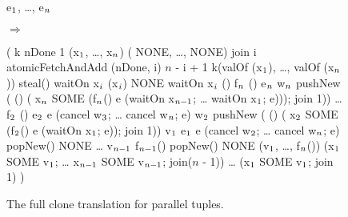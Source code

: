 \documentclass[11pt]{article}
\begin{document}
\begin{figure}
\begin{center}
\begin{code}\cdmath{}
\LDB{} \kw{(|} e\(\sb{1}\), \ldots{}, e\(\sb{n}\) \kw{|)} \RDB{}
\end{code}%
$\Longrightarrow$ \\
\begin{code}\cdmath{}
( k \kw{=>}
    nDone \kw{=}  1
       (x\(\sb{1}\), \ldots{}, x\(\sb{n}\)) \kw{=} ( NONE, \ldots{},  NONE)
       join i \kw{=} 
           atomicFetchAndAdd (nDone, i) \kw{=} $n$ - i + 1 
            k(valOf (\kw{!}x\(\sb{1}\)), \ldots{}, valOf (\kw{!}x\(\sb{n}\)))
           steal()
       waitOn x\(\sb{i}\) \kw{=}  (\kw{!}x\(\sb{i}\)) \kw{=} NONE  waitOn x\(\sb{i}\)  ()
       f\(\sb{n}\) () \kw{=} \LDB{} e\(\sb{n}\) \RDB{}                        
       w\(\sb{n}\) \kw{=} pushNew ( () \kw{=>} (
                 x\(\sb{n}\) \kw{:=} SOME (f\(\sb{n}\)() 
                     e \kw{=>} (waitOn x\(\sb{n-1}\); \ldots{} waitOn x\(\sb{1}\); 
                                  e))); 
                 join 1))
           \ldots{} 
       f\(\sb{2}\) () \kw{=} \LDB{} e\(\sb{2}\) \RDB{}  e \kw{=>} (cancel w\(\sb{3}\); \ldots{} cancel w\(\sb{n}\);
                                      e)
       w\(\sb{2}\) \kw{=} pushNew ( () \kw{=>} (
                 x\(\sb{2}\) \kw{:=} SOME (f\(\sb{2}\)()  e \kw{=>} (waitOn x\(\sb{1}\); 
                                                e)); 
                 join 1)) 
       v\(\sb{1}\) \kw{=} \LDB{} e\(\sb{1}\) \RDB{} 
                e \kw{=>} (cancel w\(\sb{2}\); \ldots{} cancel w\(\sb{n}\);  e)
       popNew() \kw{<>} NONE 
          \ldots{}
            v\(\sb{n-1}\) \kw{=} f\(\sb{n-1}\)()
             popNew() \kw{<>} NONE 
                (v\(\sb{1}\), \ldots{}, f\(\sb{n}\)())
                (x\(\sb{1}\) \kw{:=} SOME v\(\sb{1}\); \ldots{} x\(\sb{n-1}\) \kw{:=} SOME v\(\sb{n-1}\); 
                 join($n$ - 1))
          \ldots{}
          (x\(\sb{1}\) \kw{:=} SOME v\(\sb{1}\); join 1)
  )
\end{code}
\end{center}
 \caption{The full clone translation for parallel tuples.}
 \label{fig:ptup-clone}
\end{figure}%
\end{document}
